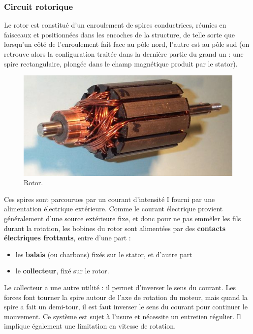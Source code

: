 \documentclass[11pt,a4paper]{report}
\begin{document}
\subsubsection*{Circuit rotorique}

Le rotor est constitué d'un enroulement de spires conductrices, réunies en faisceaux et positionnées dans les encoches de la structure, de telle sorte que lorsqu'un côté de l'enroulement fait face au pôle nord, l'autre est au pôle sud (on retrouve alors la configuration traitée dans la dernière partie du grand un : une spire rectangulaire, plongée dans le champ magnétique produit par le stator).

\begin{figure}[h!]
	\begin{center}
		\includegraphics[scale = 0.60]{rotor.png}
	\end{center}
	\caption{Rotor.} 
	\label{fig:rails_Laplace}	
\end{figure}

Ces spires sont parcourues par un courant d'intensité I fourni par une alimentation électrique extérieure. Comme le courant électrique provient généralement d'une source extérieure fixe, et donc pour ne pas emmêler les fils durant la rotation, les bobines du rotor sont alimentées par des \textbf{contacts électriques frottants}, entre d'une part :
\begin{itemize}
	\item les \textbf{balais} (ou charbons) fixés sur le stator, et d'autre part
	\item le \textbf{collecteur}, fixé sur le rotor.
\end{itemize}
Le collecteur a une autre utilité : il permet d'inverser le sens du courant. Les forces font tourner la spire autour de l'axe de rotation du moteur, mais quand la spire a fait un demi-tour, il est faut inverser le sens du courant pour continuer le mouvement. Ce système est sujet à l'usure et nécessite un entretien régulier. Il implique également une limitation en vitesse de rotation.
\end{document}
